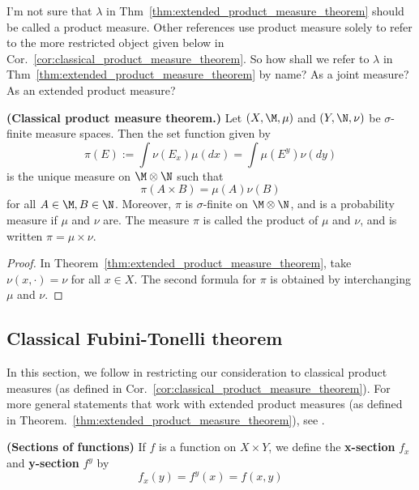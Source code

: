 \documentclass{article} %
\begin{document}
\begin{question}
I'm not sure that $\lambda$ in Thm~\ref{thm:extended_product_measure_theorem} should be called a product measure.  Other references use product measure solely to refer to the more restricted object given below in Cor.~\ref{cor:classical_product_measure_theorem}.  So how shall we refer to $\lambda$ in Thm~\ref{thm:extended_product_measure_theorem} by name?  As a joint measure?  As an extended product measure?
\end{question}


\begin{corollary}\textbf{(Classical product measure theorem.)}
Let $(X, \M, \mu)$ and $(Y, \N, \nu)$ be $\sigma$-finite measure spaces.  Then the set function given by 
\[ \pi(E) := \int \nu(E_x) \mu(dx) = \int \mu(E^y) \nu(dy) \]
is the unique measure on $\M \otimes \N$ such that 
\[ \pi(A \times B) = \mu(A) \nu(B) \]
for all $A \in \M, B \in \N$.  Moreover, $\pi$ is $\sigma$-finite on $\M \otimes \N$, and is a probability measure if $\mu$ and $\nu$ are.  The measure $\pi$ is called the product of $\mu$ and $\nu$, and is written $\pi = \mu \times \nu$.
\label{cor:classical_product_measure_theorem}
\end{corollary}

\begin{proof}
In Theorem~\ref{thm:extended_product_measure_theorem}, take $\nu(x, \cdot) = \nu$ for all $x \in X$.  The second formula for $\pi$ is obtained by interchanging $\mu$ and $\nu$.	
\end{proof}

\subsection{Classical Fubini-Tonelli theorem}

In this section, we follow \cite{folland1999real} in restricting our consideration to classical product measures (as defined in Cor.~\ref{cor:classical_product_measure_theorem}).  For more general statements that work with extended product measures (as defined in Theorem.~\ref{thm:extended_product_measure_theorem}), see \cite[pp.105]{ash2000probability}. 

\begin{definition}\textbf{(Sections of functions)} If $f$ is a function on $X \times Y$, we define the \textbf{x-section} $f_x$ and \textbf{y-section} $f^y$ by
\[ f_x(y) = f^y(x) = f(x,y)\] 	
\end{definition}
\end{document}
